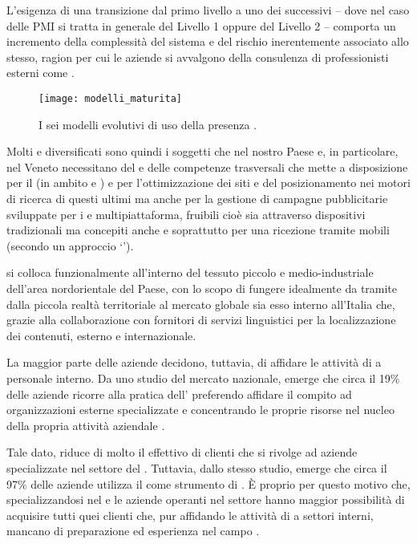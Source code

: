 L'esigenza di una transizione dal primo livello a uno dei successivi -- dove nel caso delle PMI si tratta in generale del Livello 1 oppure del Livello 2 -- comporta un incremento della complessità del sistema e del rischio inerentemente associato allo stesso, ragion per cui le aziende si avvalgono della consulenza di professionisti esterni come \customer.

\begin{figure}[H]
  \centering
  \texttt{[image: modelli\_maturita]}
  \caption{I sei modelli evolutivi di uso della presenza .}
  \label{fig:maturitylevels}
\end{figure}

Molti e diversificati sono quindi i soggetti che nel nostro Paese e, in particolare, nel Veneto necessitano del  e delle competenze trasversali che \customer mette a disposizione per il  \mktg (in ambito  e ) e per l'ottimizzazione dei siti e del posizionamento nei motori di ricerca di questi ultimi ma anche per la gestione di campagne pubblicitarie sviluppate  per i  e multipiattaforma, fruibili cioè sia attraverso dispositivi tradizionali ma concepiti anche e soprattutto per una ricezione tramite  mobili (secondo un approccio `').

\customer si colloca funzionalmente all'interno del tessuto piccolo e medio-industriale dell'area nordorientale del Paese, con lo scopo di fungere idealmente da tramite dalla piccola realtà territoriale al mercato globale sia esso interno all'Italia che, grazie alla collaborazione con fornitori di servizi linguistici per la localizzazione dei contenuti, esterno e internazionale.

La maggior parte delle aziende decidono, tuttavia, di affidare le attività di \mktg a personale interno. Da uno studio del mercato nazionale, emerge che circa il 19\% delle aziende ricorre alla pratica dell' preferendo affidare il compito ad organizzazioni esterne specializzate e concentrando le proprie risorse nel nucleo della propria attività aziendale \cite{picciaiola:indagine}.

Tale dato, riduce di molto il  effettivo di clienti che si rivolge ad aziende specializzate nel settore del \mktg.
Tuttavia, dallo stesso studio, emerge che circa il 97\% delle aziende utilizza il  come strumento di \mktg. È  proprio per questo motivo che, specializzandosi nel \mktg {} e  le aziende operanti nel settore hanno maggior possibilità di acquisire tutti quei clienti che, pur affidando le attività di \mktg a settori interni,  mancano di preparazione ed esperienza nel campo .

